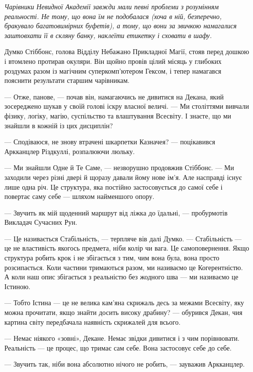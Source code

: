 \documentclass[12pt, a4paper, openany]{book}
\begin{document}
\begin{terrybox}
\textit{Чарівники Невидної Академії завжди мали певні проблеми з розумінням реальності. Не тому, що вона їм не подобалася (хоча в ній, безперечно, бракувало багатовимірних буфетів), а тому, що вони за звичкою намагалися заштовхати її в скляну банку, наклеїти етикетку і сховати в шафу.}

\medskip

Думко Стіббонс, голова Відділу Небажано Прикладної Магії, стояв перед дошкою і втомлено протирав окуляри. Він щойно провів цілий місяць у глибоких роздумах разом із магічним суперкомп'ютером Гексом, і тепер намагався пояснити результати старшим чарівникам.

--- Отже, панове, --- почав він, намагаючись не дивитися на Декана, який зосереджено шукав у своїй голові іскру власної величі. --- Ми століттями вивчали фізику, логіку, магію, суспільство та влаштування Всесвіту. І знаєте, що ми знайшли в кожній із цих дисциплін?

--- Сподіваюся, не знову втрачені шкарпетки Казначея? --- поцікавився Аркканцлер Різдкуллі, розпалюючи люльку.

--- Ми знайшли Одне й Те Саме, --- незворушно продовжив Стіббонс. --- Ми заходили через різні двері й щоразу давали йому нове ім'я. Але насправді існує лише одна річ. Це структура, яка постійно застосовується до самої себе і повертає саму себе --- шляхом найменшого опору.

--- Звучить як мій щоденний маршрут від ліжка до їдальні, --- пробурмотів Викладач Сучасних Рун.

--- Це називається Стабільність, --- терпляче вів далі Думко. --- Стабільність --- це не властивість якогось предмета, ніби колір чи вага. Це самоповернення. Якщо структура робить крок і не збігається з тим, чим вона була, вона просто розсипається. Коли частини тримаються разом, ми називаємо це Когерентністю. А коли наш опис збігається з реальністю без жодного шва --- ми називаємо це Істиною.

--- Тобто Істина --- це не велика кам'яна скрижаль десь за межами Всесвіту, яку можна прочитати, якщо знайти досить високу драбину? --- обурився Декан, чия картина світу передбачала наявність скрижалей для всього.

--- Немає ніякого «зовні», Декане. Немає звідки дивитися і з чим порівнювати. Реальність --- це процес, що тримає сам себе. Вона застосовує себе до себе.

--- Звучить так, ніби вона абсолютно нічого не робить, --- зауважив Аркканцлер.


\end{terrybox}
\end{document}
